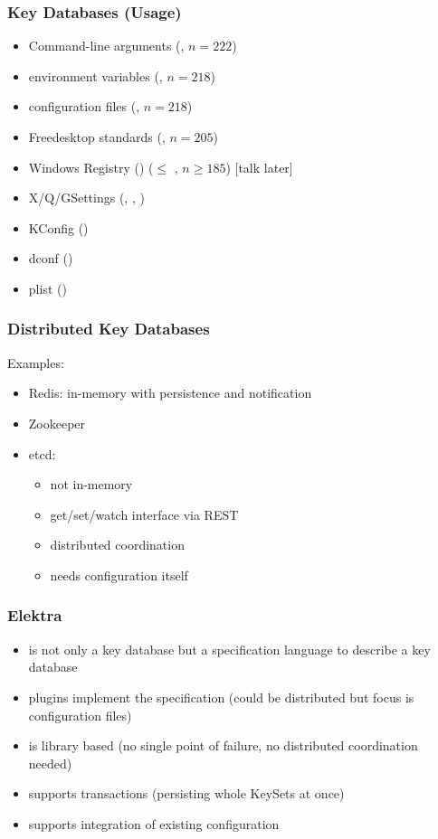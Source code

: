 \begin{frame}
	\frametitle{Key Databases (Usage)}

	\methodQuestion{} 

	\begin{itemize}
	\item Command-line arguments (, $n=222$)
	\item environment variables (, $n=218$)
	\item configuration files (, $n=218$)
	\item Freedesktop standards (, $n=205$)
	\item Windows Registry () ($\leq$ , $n\geq185$) [talk later]
	\item X/Q/GSettings (, , )
	\item KConfig ()
	\item dconf ()
	\item plist ()
	\end{itemize}

\end{frame}

\begin{frame}
	\frametitle{Distributed Key Databases}

	Examples:

	\begin{itemize}
	\item Redis: in-memory with persistence and notification
	\item Zookeeper
	\item etcd:
		\begin{itemize}
		\item not in-memory
		\item get/set/watch interface via REST
		\item distributed coordination~\cite{ongaro2014search}
		\item needs configuration itself
		\end{itemize}
	\end{itemize}
\end{frame}

\begin{frame}
	\frametitle{Elektra}

	\begin{itemize}
	\item is not only a key database but a specification language to describe a key database
	\item plugins implement the specification (could be distributed but focus is configuration files)
	\item is library based (no single point of failure, no distributed coordination needed)
	\item supports transactions (persisting whole KeySets at once)
	\item supports integration of existing configuration
	\end{itemize}
\end{frame}



